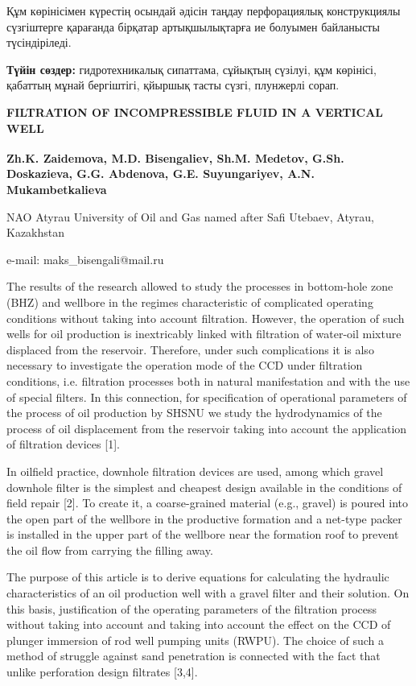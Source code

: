 Құм көрінісімен күрестің осындай әдісін таңдау перфорациялық
конструкциялы сүзгіштерге қарағанда бірқатар артықшылықтарға ие болуымен
байланысты түсіндіріледі.

{\bfseries Түйін сөздер:} гидротехникалық сипаттама, сұйықтың сүзілуі, құм
көрінісі, қабаттың мұнай бергіштігі, қйыршық тасты сүзгі, плунжерлі
сорап.

\begin{articleheader}
{\bfseries FILTRATION OF INCOMPRESSIBLE FLUID IN A VERTICAL WELL}

{\bfseries
Zh.K. Zaidemova,
M.D. Bisengaliev\textsuperscript{\envelope },
Sh.M. Medetov,
G.Sh. Doskazieva,
G.G. Abdenova,
G.E. Suyungariyev,
A.N. Mukambetkalieva
}
\end{articleheader}

\begin{affiliation}
NAO Atyrau University of Oil and Gas named after Safi Utebaev, Atyrau, Kazakhstan

e-mail: maks\_bisengali@mail.ru
\end{affiliation}

The results of the research allowed to study the processes in
bottom-hole zone (BHZ) and wellbore in the regimes characteristic of
complicated operating conditions without taking into account filtration.
However, the operation of such wells for oil production is inextricably
linked with filtration of water-oil mixture displaced from the
reservoir. Therefore, under such complications it is also necessary to
investigate the operation mode of the CCD under filtration conditions,
i.e. filtration processes both in natural manifestation and with the use
of special filters. In this connection, for specification of operational
parameters of the process of oil production by SHSNU we study the
hydrodynamics of the process of oil displacement from the reservoir
taking into account the application of filtration devices {[}1{]}.

In oilfield practice, downhole filtration devices are used, among which
gravel downhole filter is the simplest and cheapest design available in
the conditions of field repair {[}2{]}. To create it, a coarse-grained
material (e.g., gravel) is poured into the open part of the wellbore in
the productive formation and a net-type packer is installed in the upper
part of the wellbore near the formation roof to prevent the oil flow
from carrying the filling away.

The purpose of this article is to derive equations for calculating the
hydraulic characteristics of an oil production well with a gravel filter
and their solution. On this basis, justification of the operating
parameters of the filtration process without taking into account and
taking into account the effect on the CCD of plunger immersion of rod
well pumping units (RWPU). The choice of such a method of struggle
against sand penetration is connected with the fact that unlike
perforation design filtrates {[}3,4{]}.


